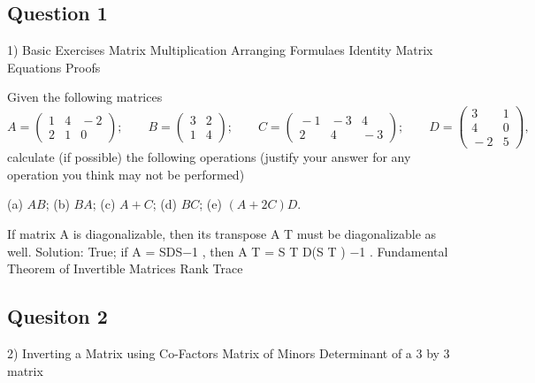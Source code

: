 \subsection*{Question 1}
1) Basic Exercises
	Matrix Multiplication
	Arranging Formulaes
	Identity Matrix Equations
	Proofs
	
Given the following matrices
\begin{equation*}
 \!\!\!\!\!\!\!\!\!\!\!\!\!\!\!\!A=\left( \begin{array}{ccc}
1 & 4 & \!\!\!-2\\
2 & 1 & 0\end{array} \right);\qquad B=\left( \begin{array}{cc}
3 & 2\\
1 & 4 \end{array} \right);\qquad
C=\left( \begin{array}{ccc}
\!\!\!\!-1 & \!\!\!\!-3 & 4\\
2 & 4 & \!\!\!\!-3\end{array}\right);\qquad D=\left( \begin{array}{cc}
3 & 1\\
4 & 0\\
\!\!\!\!-2 & 5 \end{array} \right),
\end{equation*}
calculate (if possible) the following operations (justify your
answer for any operation you think may not be performed)

(a) $AB$; (b)  $BA$; (c) $A+C$; (d)  $BC$; (e) $(A+2C)D$.





If matrix A is diagonalizable, then its transpose A
T must be diagonalizable as well.
Solution: True; if A = SDS−1
, then A
T = S
T D(S
T
)
−1
.
Fundamental Theorem of Invertible Matrices
Rank
Trace

\subsection*{Quesiton 2}

2) Inverting a Matrix using Co-Factors
	Matrix of Minors
	Determinant of a 3 by 3 matrix

